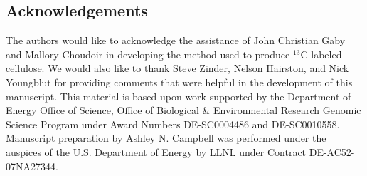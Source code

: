 \subsection{Acknowledgements} The authors would like to acknowledge the
assistance of John Christian Gaby and Mallory Choudoir in developing the method
used to produce $^{13}$C-labeled cellulose. We would also like to thank
Steve Zinder, Nelson Hairston, and Nick Youngblut for providing comments that
were helpful in the development of this manuscript. This material is based upon
work supported by the Department of Energy Office of Science, Office of
Biological \& Environmental Research Genomic Science Program under Award Numbers
DE-SC0004486 and DE-SC0010558. Manuscript preparation by Ashley N. Campbell was
performed under the auspices of the U.S. Department of Energy by LLNL under
Contract DE-AC52-07NA27344.

